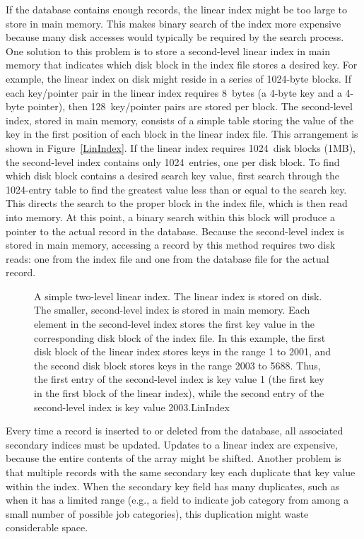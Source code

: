 If the database contains enough records, the linear index might
be too large to store in main memory.
This makes binary search of the index more expensive because many disk
accesses would typically be required by the search process.
One solution to this problem is to store a second-level linear index
in main memory that indicates which disk block in the index file
stores a desired key.
For example, the linear index on disk might reside in a series of
1024-byte blocks.
If each key/pointer pair in the linear index requires 8~bytes
(a 4-byte key and a 4-byte pointer), then
128~key/pointer pairs are stored per block.
The second-level index, stored in main memory, consists of a simple
table storing the value of the key in the first position of each block
in the linear index file.
This arrangement is shown in Figure~\ref{LinIndex}.
If the linear index requires 1024~disk blocks (1MB), the second-level
index contains only 1024~entries, one per disk block.
To find which disk block contains a desired search key value,
first search through the 1024-entry table to
find the greatest value less than or equal to the search key.
This directs the search to the proper block in the index file, which
is then read into memory.
At this point, a binary search within this block
will produce a pointer to the actual record in the database.
Because the second-level index is stored in main memory,
accessing a record by this method requires two disk reads:
one from the index file and one from the database file for the actual
record.

\begin{figure}

\medskip
{}
{A simple two-level linear index.
The linear index is stored on disk.
The smaller, second-level index is stored in main memory.
Each element in the second-level index stores the first key value in
the corresponding disk block of the index file.
In this example, the first disk block of the linear index stores keys
in the range 1 to 2001, and the second disk block stores keys in the
range 2003 to 5688.
Thus, the first entry of the second-level index is key value 1
(the first key in the first block of the linear index), while the
second entry of the second-level index is key value 2003.}{LinIndex}
\bigskip\medskip
\end{figure}

Every time a record is inserted to or deleted from the database,
all associated secondary indices must be updated.
Updates to a linear index are expensive, because the
entire contents of the array might be shifted.
Another problem is that multiple records with
the same secondary key each duplicate that key value within the
index.
When the secondary key field has many duplicates, such as when it has
a limited range (e.g., a field to indicate job category from among a
small number of possible job categories),
this duplication might waste considerable space.

